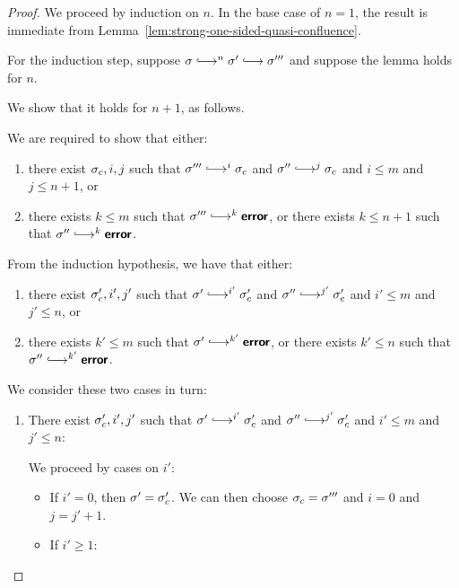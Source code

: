 \begin{proof}
  We proceed by induction on $n$.  In the base case of $n = 1$, the
  result is immediate from Lemma~\ref{lem:strong-one-sided-quasi-confluence}.

  For the induction step, suppose $\conf \parstepsto^n \conf'
  \parstepsto \conf'''$ and suppose the lemma holds for $n$.

  We show that it holds for $n + 1$, as follows.

  We are required to show that either:
  \begin{enumerate}
  \item there exist $\sigma_c, i, j$ such that $\conf''' \parstepsto^i
    \conf_c$ and $\conf'' \parstepsto^j \conf_c$ and $i \leq m$ and $j
    \leq n + 1$, or
  \item there exists $k \leq m$ such that $\conf''' \parstepsto^k
    \error$, or there exists $k \leq n + 1$ such that $\conf''
    \parstepsto^k \error$.
  \end{enumerate}

  From the induction hypothesis, we have that either:
  \begin{enumerate}
  \item there exist $\sigma'_c, i', j'$ such that $\conf'
    \parstepsto^{i'} \conf'_c$ and $\conf'' \parstepsto^{j'} \conf'_c$
    and $i' \leq m$ and $j' \leq n$, or
  \item there exists $k' \leq m$ such that $\conf' \parstepsto^{k'}
    \error$, or there exists $k' \leq n$ such that $\conf''
    \parstepsto^{k'} \error$.
  \end{enumerate}

  We consider these two cases in turn:

  \begin{enumerate}
  \item There exist $\sigma'_c, i', j'$ such that $\conf'
    \parstepsto^{i'} \conf'_c$ and $\conf'' \parstepsto^{j'} \conf'_c$
    and $i' \leq m$ and $j' \leq n$:

    We proceed by cases on $i'$:
    \begin{itemize}

    \item If $i' = 0$, then $\sigma' = \sigma_c'$.  We can then choose
      $\sigma_c = \sigma'''$ and $i = 0$ and $j = j' + 1$.

    \item If $i' \geq 1$:


\end{itemize}
\end{enumerate}
\end{proof}
